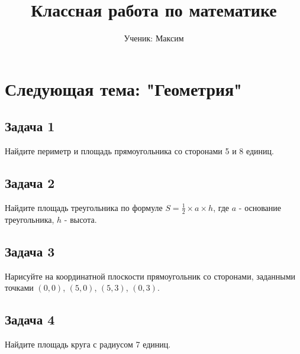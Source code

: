 \documentclass{article}
\begin{document}
\title{Классная работа по математике}
\author{Ученик: Максим}
\date{}
\maketitle

\section*{Следующая тема: "Геометрия"}

\subsection*{Задача 1}
Найдите периметр и площадь прямоугольника со сторонами 5 и 8 единиц.

\subsection*{Задача 2}
Найдите площадь треугольника по формуле $S = \frac{1}{2} \times a \times h$, где $a$ - основание треугольника, $h$ - высота.

\subsection*{Задача 3}
Нарисуйте на координатной плоскости прямоугольник со сторонами, заданными точками $(0,0)$, $(5,0)$, $(5,3)$, $(0,3)$.

\subsection*{Задача 4}
Найдите площадь круга с радиусом 7 единиц.
\end{document}

